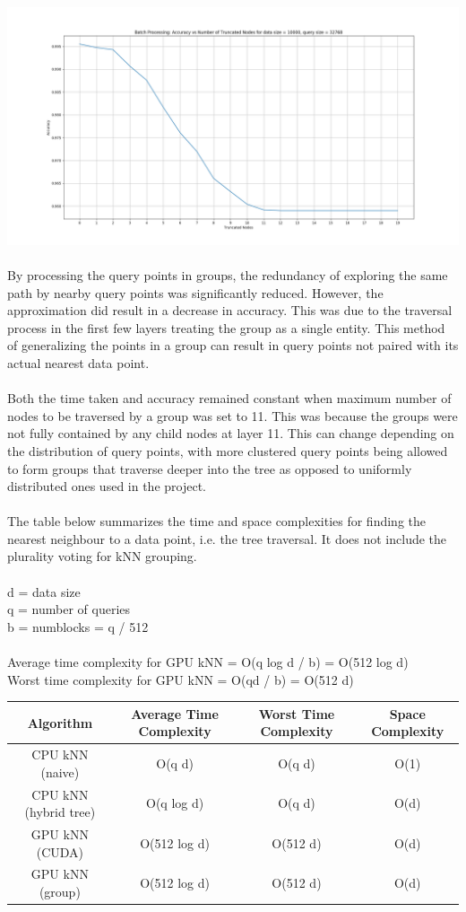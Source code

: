\documentclass{article}
\begin{document}
\includegraphics[scale=0.18]{../batchtree/graphs/batch_accu}\\
\\
By processing the query points in groups, the redundancy of exploring the same path by nearby query points was significantly reduced. However, the approximation did result in a decrease in accuracy. This was due to the traversal process in the first few layers treating the group as a single entity. This method of generalizing the points in a group can result in query points not paired with its actual nearest data point.\\
\\
\newpage\noindent
Both the time taken and accuracy remained constant when maximum number of nodes to be traversed by a group was set to 11. This was because the groups were not fully contained by any child nodes at layer 11. This can change depending on the distribution of query points, with more clustered query points being allowed to form groups that traverse deeper into the tree as opposed to uniformly distributed ones used in the project.\\
\\
The table below summarizes the time and space complexities for finding the nearest neighbour to a data point, i.e. the tree traversal. It does not include the plurality voting for kNN grouping.\\
\\
d = data size\\
q = number of queries\\
b = numblocks = q / 512\\
\\
Average time complexity for GPU kNN = O(q log d / b) = O(512 log d)\\
Worst time complexity for GPU kNN = O(qd / b) = O(512 d)\\
\begin{center}
 \begin{tabular}{||c c c c||} 
 \hline
 Algorithm & Average Time Complexity & Worst Time Complexity & Space Complexity \\ [0.5ex] 
 \hline\hline
 CPU kNN (naive) & O(q d) & O(q d) & O(1) \\ 
 \hline
 CPU kNN (hybrid tree) & O(q log d) & O(q d) & O(d) \\
 \hline
 GPU kNN (CUDA) & O(512 log d) & O(512 d) & O(d) \\
 \hline
 GPU kNN (group) & O(512 log d) & O(512 d) & O(d) \\
 \hline
\end{tabular}
\end{center}
\end{document}
